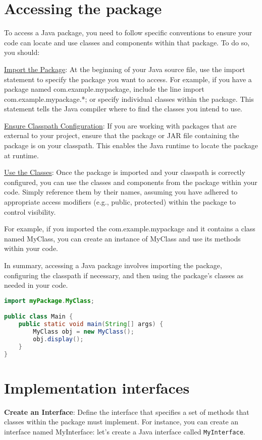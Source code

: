 \documentclass{article}
\begin{document}
\section*{Accessing the package}

To access a Java package, you need to follow specific conventions to ensure your code can locate and use classes and components within that package. To do so, you should:

\underline{Import the Package}: At the beginning of your Java source file, use the import statement to specify the package you want to access. For example, if you have a package named com.example.mypackage, include the line import com.example.mypackage.*; or specify individual classes within the package. This statement tells the Java compiler where to find the classes you intend to use.

\underline{Ensure Classpath Configuration}: If you are working with packages that are external to your project, ensure that the package or JAR file containing the package is on your classpath. This enables the Java runtime to locate the package at runtime.

\underline{Use the Classes}: Once the package is imported and your classpath is correctly configured, you can use the classes and components from the package within your code. Simply reference them by their names, assuming you have adhered to appropriate access modifiers (e.g., public, protected) within the package to control visibility.

For example, if you imported the com.example.mypackage and it contains a class named MyClass, you can create an instance of MyClass and use its methods within your code.

In summary, accessing a Java package involves importing the package, configuring the classpath if necessary, and then using the package's classes as needed in your code. 
\begin{lstlisting}[language=Java, backgroundcolor=\color{gray!10}]
import myPackage.MyClass;

public class Main {
    public static void main(String[] args) {
        MyClass obj = new MyClass();
        obj.display();
    }
}
\end{lstlisting}

\section*{Implementation interfaces}


\textbf{Create an Interface}: Define the interface that specifies a set of methods that classes within the package must implement. For instance, you can create an interface named MyInterface:
let's create a Java interface called \texttt{MyInterface}.
\end{document}
